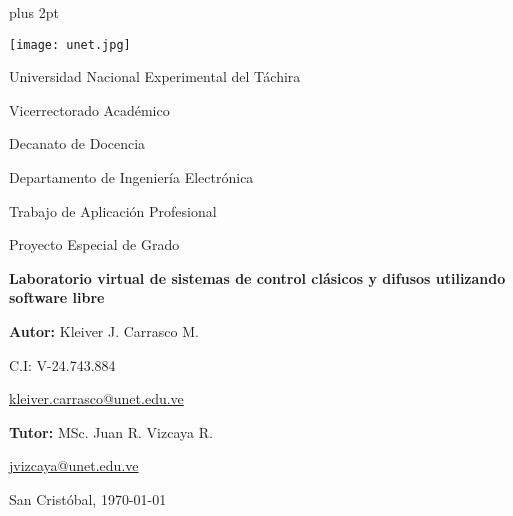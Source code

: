 \begin{titlepage}
	\parskip=7.25pt plus 2pt
	\begin{center}
		\texttt{[image: unet.jpg]}
		
		Universidad Nacional Experimental del Táchira 
		
		Vicerrectorado Académico
		
		Decanato de Docencia
		
		Departamento de Ingeniería Electrónica
		
		Trabajo de Aplicación Profesional
		
		Proyecto Especial de Grado
	\end{center}
	
	\centering
		\vspace{2.5cm}
		\vfill
		{\Large \textbf{Laboratorio virtual de sistemas de control clásicos y difusos utilizando software libre}\par}
	
	\vfill
	\begin{flushright}
		\begin{spacing}{1.5}
			\textbf{Autor:} Kleiver J. Carrasco M.
			
			C.I: V-24.743.884
			
			\href{kleiver.carrasco@unet.edu.ve}{kleiver.carrasco@unet.edu.ve}
			
			\textbf{Tutor:} MSc. Juan R. Vizcaya R.
			
			\href{jvizcaya@unet.edu.ve}{jvizcaya@unet.edu.ve}
		\end{spacing}	
	\end{flushright}
	
	\vfill
		San Cristóbal, \monthyeardate\today
	\leavevmode
	\end{titlepage}